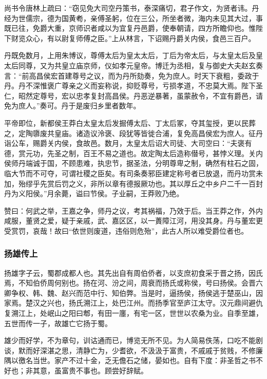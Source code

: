 \documentclass[]{article}
\begin{document}
尚书令唐林上疏曰：``窃见免大司空丹策书，泰深痛切，君子作文，为贤者讳。丹经为世儒宗，德为国黄耇，亲傅圣躬，位在三公，所坐者微，海内未见其大过，事既已往，免爵大重，京师识者咸以为宜复丹邑爵，使奉朝请，四方所瞻仰也。惟陛下财览众心，有以尉复师傅之臣。''上从林言，下诏赐丹爵关内侯，食邑三百户。

丹既免数月，上用朱博议，尊傅太后为皇太太后，丁后为帝太后，与太皇太后及皇太后同尊，又为共皇立庙京师，仪如孝元皇帝。博迁为丞相，复与御史大夫赵玄奏言：``前高昌侯宏首建尊号之议，而为丹所劾奏，免为庶人。时天下衰粗，委政于丹。丹不深惟褒广尊亲之义而妄称说，抑贬尊号，亏损孝道，不忠莫大焉。陛下圣仁，昭然定尊号，宏以忠孝复封高昌侯。丹恶逆暴著，虽蒙赦令，不宜有爵邑，请免为庶人。''奏可。丹于是废归乡里者数年。

平帝即位，新都侯王莽白太皇太后发掘傅太后、丁太后冢，夺其玺授，更以民葬之，定陶隳废共皇庙。诸造议泠褒、段犹等皆徙合浦，复免高昌侯宏为庶人。征丹诣公车，赐爵关内侯，食故邑。数月，太皇太后诏大司徒、大司空曰：``夫褒有德，赏元功，先圣之制，百王不易之道也。故定陶太后造称僣号，甚悖义理。关内侯师丹端诚于国，不顾患难，执忠节，据圣法，分明尊卑之制，确然有柱石之固，临大节而不可夺，可谓社稷之臣矣。有司条奏邪臣建定称号者已放退，而丹功赏未加，殆缪乎先赏后罚之义，非所以章有德报厥功也。其以厚丘之中乡户二千一百封丹为义阳侯。''月余薨，谥曰节侯。子业嗣，王莽败乃绝。

赞曰：何武之举，王嘉之争，师丹之议，考其祸福，乃效于后。当王莽之作，外内咸服，董贤之爱，疑于亲戚，武、嘉区区，以一蕢障江河，用没其身。丹与董宏更受赏罚，哀哉！故曰``依世则废道，违俗则危殆''，此古人所以难受爵位者也。

\hypertarget{header-n5853}{%
\subsubsection{扬雄传上}\label{header-n5853}}

扬雄字子云，蜀郡成都人也。其先出自有周伯侨者，以支庶初食采于晋之扬，因氏焉，不知伯侨周何别也。扬在河、汾之间，周衰而扬氏或称侯，号曰扬侯。会晋六卿争权、韩、魏、赵兴而范中行、知伯弊。当是时，逼扬侯，扬侯逃于楚巫山，因家焉。楚汉之兴也，扬氏溯江上，处巴江州。而扬季官至庐江太守。汉元鼎间避仇复溯江上，处岷山之阳曰郫，有田一廛，有宅一区，世世以农桑为业。自季至雄，五世而传一子，故雄亡它扬于蜀。

雄少而好学，不为章句，训诂通而已，博览无所不见。为人简易佚荡，口吃不能剧谈，默而好深湛之思，清静亡为，少耆欲，不汲汲于富贵，不戚戚于贫贱，不修廉隅以徼名当世。家产不过十金，乏无儋石之储，晏如也。自有下度：非圣哲之书不好也；非其意，虽富贵不事也。顾尝好辞赋。
\end{document}
